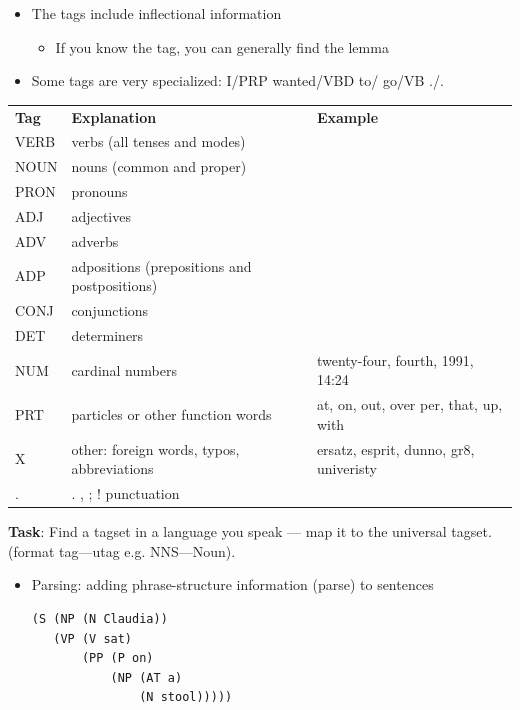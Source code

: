 \documentclass[a4paper,landscape,headrule,footrule,dvips]{foils}
\begin{document}
\begin{CJK}{UTF8}{min}
\begin{itemize}
\item The tags include inflectional information
  \begin{itemize}
  \item If you know the tag, you can generally find the lemma
  \end{itemize}
\item Some tags are very specialized: I/PRP wanted/VBD to/ go/VB ./.
\end{itemize}

{\small
\noindent\begin{tabular}{lll}
\textbf{Tag} & \textbf{Explanation} & \textbf{Example}\\
VERB & verbs (all tenses and modes) &   \\
NOUN & nouns (common and proper) &   \\
PRON & pronouns &   \\
ADJ & adjectives &   \\
ADV & adverbs &   \\
ADP & adpositions (prepositions and postpositions) &   \\
CONJ & conjunctions &   \\
DET & determiners &   \\
NUM & cardinal numbers & twenty-four, fourth, 1991, 14:24  \\
PRT & particles or other function words & at, on, out, over per, that, up, with  \\
X & other: foreign words, typos, abbreviations &  ersatz, esprit, dunno, gr8, univeristy \\
. & . , ; ! punctuation 
\end{tabular}
}


\textbf{Task}: Find a tagset in a language you speak --- map it to
the universal tagset.  (format tag---utag e.g. NNS---Noun).



\begin{itemize}\addtolength{\itemsep}{-1.5ex}
\item  Parsing: adding phrase-structure information (parse) to sentences
\begin{verbatim}
(S (NP (N Claudia))
   (VP (V sat)
       (PP (P on)
           (NP (AT a)
               (N stool)))))
\end{verbatim}


\end{itemize}
\end{CJK}
\end{document}
